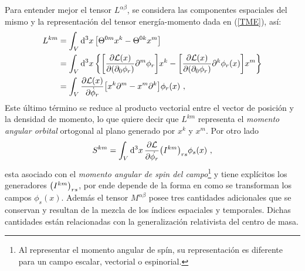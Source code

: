 Para entender mejor el tensor $L^{\alpha \beta}$, se considera las componentes espaciales del mismo y la representación del tensor energía-momento dada en (\ref{TME}), así:
\begin{equation}
    \begin{split}
        L^{km} &= \int_{V} \dd[3]{x} \qty[\Theta ^{0m}x^{k}-\Theta ^{0k}x^{m}] \\
        &= \int_{V} \dd[3]{x} \qty{ \qty[\frac{\partial \mathcal{L(}x)}{\partial (\partial _{0}\phi _{r})}\partial ^{m}\phi_{r}]x^{k}-\qty[\frac{\partial \mathcal{L(}x)}{\partial (\partial _{0}\phi _{r})} \partial ^{k}\phi _{r}(x)]x^{m}} \\
        &= \int_{V}\frac{\partial \mathcal{L(}x)}{\partial \dot{\phi}_{r}} \qty[x^{k}\partial ^{m}-x^{m}\partial ^{k}]\phi _{r}(x)~,
    \end{split}
    \label{eq2.129}
\end{equation}
Este último término se reduce al producto vectorial entre el vector de posición y la densidad de momento, lo que quiere decir que $L^{km}$ representa el \emph{momento angular orbital} ortogonal al plano generado por $x^{k}$ y $x^{m}$. Por otro lado
\begin{equation}
    S^{k m} = \int_{V} \dd[3]{x} \pdv{\mathcal{L}}{\dot{\phi_{r}}} \qty(I^{k m})_{rs}\phi _{s}(x)~,
    \label{eq2.130}
\end{equation}
esta asociado con el \emph{momento angular de spin del campo}\footnote{Al representar el momento angular de spín, su representación es diferente para un campo escalar, vectorial o espinorial.} y tiene explícitos los generadores $\qty(I^{k m})_{rs}$, por ende depende de la forma en como se transforman los campos $\phi_{s}(x)$. Además el tensor $M^{\alpha \beta}$ posee tres cantidades adicionales que se conservan y resultan de la mezcla de los índices espaciales y temporales. Dichas cantidades están relacionadas con la generalización relativista del centro de masa. 





